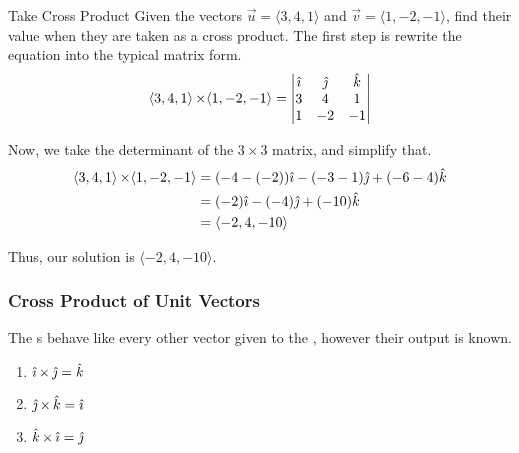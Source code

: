 \begin{example}[Lecture 4]{Take Cross Product}
  Given the vectors $\vec{u} = \langle 3, 4, 1 \rangle$ and $\vec{v} = \langle 1, -2, -1 \rangle$, find their value when they are taken as a cross product.
  \tcblower{}
  The first step is rewrite the  equation into the typical matrix form.
  \begin{equation*}
    \langle 3, 4, 1 \rangle \operatorname{\times} \langle 1, -2, -1 \rangle =
    \begin{vmatrix}
      \hat{\imath} & \hat{\jmath} & \hat{k} \\
      3 & 4 & 1 \\
      1 & -2 & -1
    \end{vmatrix}
  \end{equation*}

  Now, we take the determinant of the $3 \times 3$ matrix, and simplify that.
  \begin{align*}
    \langle 3, 4, 1 \rangle \operatorname{\times} \langle 1, -2, -1 \rangle &= (-4 - (-2))\hat{\imath} - (-3 - 1)\hat{\jmath} + (-6 - 4) \hat{k} \\
                                                             &= (-2)\hat{\imath} - (-4)\hat{\jmath} + (-10)\hat{k} \\
                                                             &= \langle -2, 4, -10 \rangle
  \end{align*}

  Thus, our solution is $\langle -2, 4, -10 \rangle$.
\end{example}

\subsubsection{Cross Product of Unit Vectors}\label{subsubsec:Unit_Vector_Cross_Product}
The s behave like every other vector given to the , however their output is known.
\begin{enumerate}[noitemsep]
\item $\hat{\imath} \operatorname{\times} \hat{\jmath} = \hat{k}$
\item $\hat{\jmath} \operatorname{\times} \hat{k} = \hat{\imath}$
\item $\hat{k} \operatorname{\times} \hat{\imath} = \hat{\jmath}$
\end{enumerate}


